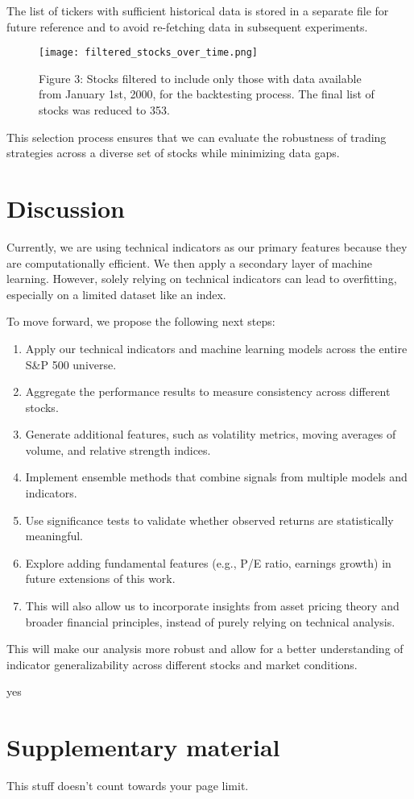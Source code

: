 \documentclass{article}
\begin{document}
The list of tickers with sufficient historical data is stored in a separate file for future reference and to avoid re-fetching data in subsequent experiments.

\begin{figure}[h]
    \centering
    \texttt{[image: filtered\_stocks\_over\_time.png]}
    \caption{Figure 3: Stocks filtered to include only those with data available from January 1st, 2000, for the backtesting process. The final list of stocks was reduced to 353.}
    \label{fig:filtered_stocks}
\end{figure}

This selection process ensures that we can evaluate the robustness of trading strategies across a diverse set of stocks while minimizing data gaps.

\section{Discussion}
Currently, we are using technical indicators as our primary features because they are computationally efficient. We then apply a secondary layer of machine learning. However, solely relying on technical indicators can lead to overfitting, especially on a limited dataset like an index.

To move forward, we propose the following next steps:
\begin{enumerate}
    \item Apply our technical indicators and machine learning models across the entire S\&P 500 universe.
    \item Aggregate the performance results to measure consistency across different stocks.
    \item Generate additional features, such as volatility metrics, moving averages of volume, and relative strength indices.
    \item Implement ensemble methods that combine signals from multiple models and indicators.
    \item Use significance tests to validate whether observed returns are statistically meaningful.
    \item Explore adding fundamental features (e.g., P/E ratio, earnings growth) in future extensions of this work.
    \item This will also allow us to incorporate insights from asset pricing theory and broader financial principles, instead of purely relying on technical analysis.
\end{enumerate}
This will make our analysis more robust and allow for a better understanding of indicator generalizability across different stocks and market conditions.

yes 


\printbibliography



\appendix

\section{Supplementary material} \label{app:info}

This stuff doesn't count towards your page limit.
\end{document}
